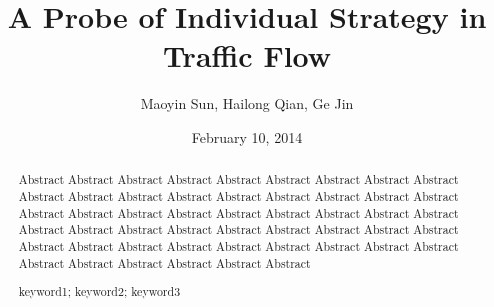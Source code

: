 \documentclass[a4paper,11pt]{article}
\title{A Probe of Individual Strategy in Traffic Flow}
\author{\small {Maoyin Sun, Hailong Qian, Ge Jin}}
\date{February 10, 2014}
\begin{document}
\begin{abstract}

\thispagestyle{empty}
Abstract Abstract Abstract Abstract Abstract Abstract Abstract Abstract Abstract Abstract Abstract Abstract Abstract Abstract Abstract Abstract Abstract Abstract Abstract Abstract Abstract Abstract Abstract Abstract Abstract Abstract Abstract Abstract Abstract Abstract Abstract Abstract Abstract Abstract Abstract Abstract Abstract Abstract Abstract Abstract Abstract Abstract Abstract Abstract Abstract Abstract Abstract Abstract Abstract Abstract Abstract 
\begin{keywords}
keyword1; keyword2; keyword3
\end{keywords}
\end{abstract}

\maketitle
\pagestyle{empty}
\newpage         
\tableofcontents                                                  %
\newpage
\pagestyle{fancy}                                                 %

\end{document}
